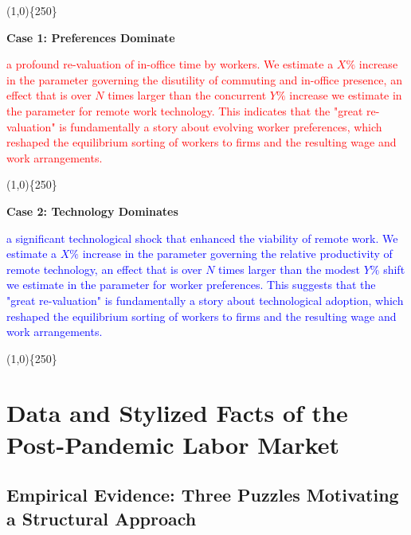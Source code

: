 \documentclass[
  11pt,
  letterpaper,
  DIV=11,
  numbers=noendperiod]{scrartcl}
\begin{document}
\line(1,0)\{250\}

\textbf{Case 1: Preferences Dominate}

\textcolor{red}{a profound re-valuation of in-office time by workers. We estimate a $X\%$ increase in the parameter governing the disutility of commuting and in-office presence, an effect that is over $N$ times larger than the concurrent $Y\%$ increase we estimate in the parameter for remote work technology. This indicates that the "great re-valuation" is fundamentally a story about evolving worker preferences, which reshaped the equilibrium sorting of workers to firms and the resulting wage and work arrangements.}

\line(1,0)\{250\}

\textbf{Case 2: Technology Dominates}

\textcolor{blue}{a significant technological shock that enhanced the viability of remote work. We estimate a $X\%$ increase in the parameter governing the relative productivity of remote technology, an effect that is over $N$ times larger than the modest $Y\%$ shift we estimate in the parameter for worker preferences. This suggests that the "great re-valuation" is fundamentally a story about technological adoption, which reshaped the equilibrium sorting of workers to firms and the resulting wage and work arrangements.}

\line(1,0)\{250\}

\section{Data and Stylized Facts of the Post-Pandemic Labor
Market}\label{data-and-stylized-facts-of-the-post-pandemic-labor-market}

\subsection{\texorpdfstring{\textbf{Empirical Evidence: Three Puzzles
Motivating a Structural
Approach}}{Empirical Evidence: Three Puzzles Motivating a Structural Approach}}\label{empirical-evidence-three-puzzles-motivating-a-structural-approach}
\end{document}
